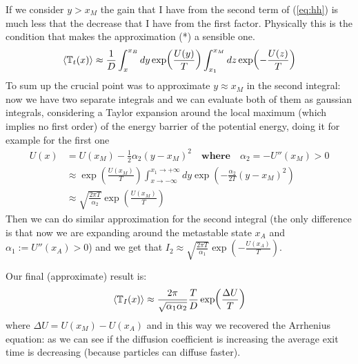 \documentclass[\main/main.tex]{subfiles}
\begin{document}
If we consider $y>x_M$ the gain that I have from the second term of (\ref{eq:hh}) is much less that the decrease that I have from the first factor. Physically this is the condition that makes the approximation (*) a sensible one.
\begin{eqnarray}
    \left\langle \mathbb{T}_t(x) \right\rangle\approx \frac{1}{D}\int_x^{x_B}dy\exp(\frac{U(y)}{T})\int_{x_{1}} ^{x_M} dz \exp(-\frac{U(z)}{T})
\end{eqnarray}
To sum up the crucial point was to approximate $y\approx x_M$ in the second integral: now we have two separate integrals and we can evaluate both of them as gaussian integrals, considering a Taylor expansion around the local maximum (which implies no first order) of the energy barrier of the potential energy, doing it for example for the first one
\begin{align}
    U(x)&=U(x_M)-\frac{1}{2}\alpha_2 (y-x_M)^2 \quad \textbf{where}\quad \alpha_2=-U{''}(x_M)>0\\
        &\approx \exp(\frac{U(x_M)}{T})\int_{x\to -\infty} ^{x_1 \to + \infty} dy \exp(-\frac{\alpha_2}{2 T}(y-x_M)^2) \\
        &\approx\sqrt{\frac{2\pi T}{\alpha_2}} \exp(\frac{U(x_M)}{T})
\end{align}
Then we can do similar approximation for the second integral (the only difference is that now we are expanding around the metastable state $x_A$ and $\alpha_1:=U''(x_A)>0$) and we get that $I_2\approx \sqrt{\frac{2\pi T}{\alpha_1}}\exp(-\frac{U(x_A)}{T})$.

Our final (approximate) result is:
\begin{eqnarray}
    \left\langle \mathbb{T}_I(x) \right\rangle\approx\frac{2\pi}{\sqrt{\alpha_1 \alpha_2}}\frac{T}{D}\exp(\frac{\Delta U}{T})
\end{eqnarray}
where $\Delta U=U(x_M)-U(x_A)$ and in this way we recovered the Arrhenius equation: as we can see if the diffusion coefficient is increasing the average exit time is decreasing (because particles can diffuse faster).
\end{document}
